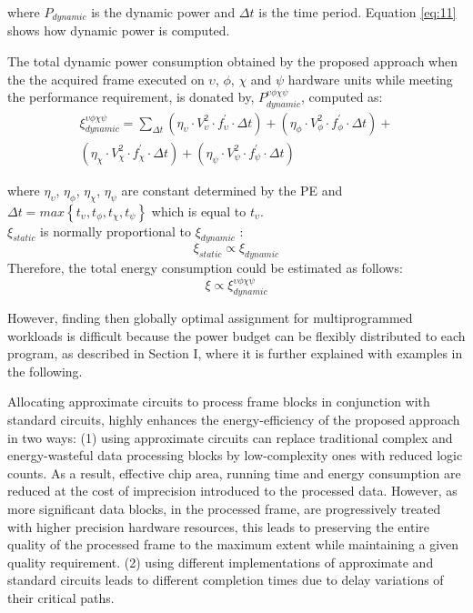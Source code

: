 \documentclass[journal]{IEEEtran}
\begin{document}
where $P_{dynamic}$ is the dynamic power and $\Delta t$ is the time period.
Equation \ref{eq:11} shows how dynamic power is computed. 

The total dynamic power consumption obtained by the proposed approach when the the acquired frame executed on $\upsilon$, $\phi$, $\chi$ and $\psi$ hardware units while meeting the performance requirement, is donated by, $P^{\upsilon \phi \chi \psi }_{dynamic}$, computed as: 
\begin{equation} \label{eq:12}
\begin{split}
\xi ^{\upsilon \phi \chi \psi }_{dynamic}=\sum_{\Delta t} 
\left (\eta_\upsilon \cdot V^{2}_\upsilon \cdot f^{'}_\upsilon \cdot \Delta t \right ) + 
\left (\eta_\phi \cdot V^{2}_\phi \cdot f^{'}_\phi \cdot \Delta t \right )+ \\
\left (\eta_\chi \cdot V^{2}_\chi \cdot f^{'}_\chi \cdot \Delta t \right )+ \left (\eta_\psi \cdot V^{2}_\psi \cdot f^{'}_\psi \cdot \Delta t \right )
\end{split}
\end{equation}

where $\eta_\upsilon$, $\eta_\phi$, $\eta_\chi$, $\eta_\psi$ are constant determined by the PE and $\Delta t = max \left \{ t_\upsilon, t_\phi,t_\chi, t_\psi\right \}$ which is equal to $t_\upsilon$. \\
$\xi_{static}$ is normally proportional to $\xi_{dynamic}$ \cite{Li2006,Piguet2004}:
\begin{equation} \label{eq:13}
\xi_{static} \propto \xi_{dynamic}
\end{equation}  
Therefore, the total energy consumption could be estimated as follows:
\begin{equation} \label{eq:14}
\xi \propto \xi ^{\upsilon \phi \chi \psi }_{dynamic}
\end{equation}   
    


However, finding then globally optimal assignment for multiprogrammed workloads is difficult because the power budget can be flexibly distributed to each program, as described in Section I, where it is further explained with examples in the following.

Allocating approximate circuits to process frame blocks in conjunction with standard circuits, highly enhances the energy-efficiency of the proposed approach in two ways: (1) using approximate circuits can replace traditional complex and energy-wasteful data processing blocks by low-complexity ones with reduced logic counts. As a result, effective chip area, running time and energy consumption are reduced at the cost of imprecision introduced to the processed data. However, as more significant data blocks, in the processed frame, are progressively treated with higher precision hardware resources, this leads to preserving the entire quality of the processed frame to the maximum extent while maintaining a given quality requirement. (2) using different implementations of approximate and standard circuits leads to different completion times due to delay variations of their critical paths.\\
\end{document}
